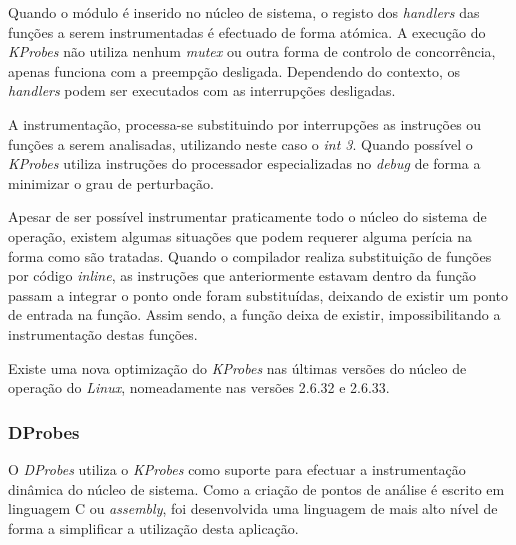 Quando o módulo é inserido no núcleo de sistema, o registo dos \textit{handlers} das funções a serem instrumentadas é efectuado de forma atómica.
A execução do \textit{KProbes} não utiliza nenhum \textit{mutex} ou outra forma de controlo de concorrência, apenas funciona com a preempção desligada.
Dependendo do contexto, os \textit{handlers} podem ser executados com as interrupções desligadas.

A instrumentação, processa-se substituindo por interrupções as instruções ou funções a serem analisadas, utilizando neste caso o \textit{int 3}.
Quando possível o \textit{KProbes} utiliza instruções do processador especializadas no \textit{debug} de forma a minimizar o grau de perturbação.

Apesar de ser possível instrumentar praticamente todo o núcleo do sistema de operação, existem algumas situações que podem requerer alguma perícia na forma como são tratadas.
Quando o compilador realiza substituição de funções por código \textit{inline}, as instruções que anteriormente estavam dentro da função passam a integrar o ponto onde foram substituídas, deixando de existir um ponto de entrada na função.
Assim sendo, a função deixa de existir, impossibilitando a instrumentação destas funções.

Existe uma nova optimização do \textit{KProbes} nas últimas versões do núcleo de operação do \textit{Linux}, nomeadamente nas versões 2.6.32 e 2.6.33.


\subsubsection{DProbes}\label{cap:Dprobe_overview}


O \textit{DProbes} utiliza o \textit{KProbes} como suporte para efectuar a instrumentação dinâmica do núcleo de sistema.
Como a criação de pontos de análise é escrito em linguagem C ou \textit{assembly}, foi desenvolvida uma linguagem de mais alto nível de forma a simplificar  a utilização desta aplicação.

